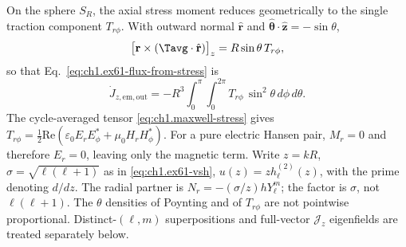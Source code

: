 On the sphere $S_R$, the axial stress moment reduces geometrically to the single traction component $T_{r\phi}$. With outward normal $\hat{\mathbf{r}}$ and $\hat{\boldsymbol{\theta}}\cdot\hat{\mathbf{z}}=-\sin\theta$,
\[
\bigl[\mathbf{r}\times(\Tavg\cdot\hat{\mathbf{r}})\bigr]_z=R\sin\theta\,T_{r\phi},
\]
so that Eq.~\eqref{eq:ch1.ex61-flux-from-stress} is
\[
\dot J_{z,\mathrm{em,out}}=-R^3\int_0^{\pi}\int_0^{2\pi}T_{r\phi}\,\sin^2\theta\,d\phi\,d\theta.
\]
The cycle-averaged tensor \eqref{eq:ch1.maxwell-stress} gives $T_{r\phi}=\tfrac12\mathrm{Re}(\varepsilon_0 E_r E_\phi^*+\mu_0 H_r H_\phi^*)$. For a pure electric Hansen pair, $M_r=0$ and therefore $E_r=0$, leaving only the magnetic term. Write $z=kR$, $\sigma=\sqrt{\ell(\ell+1)}$ as in \eqref{eq:ch1.ex61-vsh}, $u(z)=z h_\ell^{(2)}(z)$, with the prime denoting $d/dz$. The radial partner is $N_r=-(\sigma/z)h Y_\ell^m$; the factor is $\sigma$, not $\ell(\ell+1)$. The $\theta$ densities of Poynting and of $T_{r\phi}$ are not pointwise proportional. Distinct-$(\ell,m)$ superpositions and full-vector $\mathcal{J}_z$ eigenfields are treated separately below.

